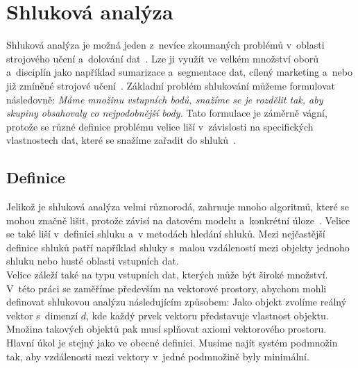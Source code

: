 \chapter{Shluková analýza} \label{sec:clusteranalysis}
Shluková analýza je možná jeden z~nevíce zkoumaných problémů v~oblasti strojového učení a~dolování dat~\cite{Aggarwal13}. Lze ji využít ve velkém množství oborů a~disciplín jako například sumarizace a~segmentace dat, cílený marketing a~nebo již zmíněné strojové učení~\cite{Jain10, Kaufman90}. Základní problém shlukování můžeme formulovat následovně: \textit{Máme množinu vstupních bodů, snažíme se je rozdělit tak, aby skupiny obsahovaly co nejpodobnější body.} Tato formulace je záměrně vágní, protože se různé definice problému velice liší v~závislosti na specifických vlastnostech dat, které se snažíme zařadit do shluků~\cite{Aggarwal13}. 

\section{Definice}
Jelikož je shluková analýza velmi různorodá, zahrnuje mnoho algoritmů, které se mohou značně lišit, protože závisí na datovém modelu a~konkrétní úloze~\cite{Aggarwal13}. Velice se také liší v~definici shluku a~v metodách hledání shluků. Mezi nejčastější definice shluků patří například shluky s~malou vzdá\-le\-nos\-tí mezi objekty jednoho shluku nebo husté oblasti vstupních dat.\\

Velice záleží také na typu vstupních dat, kterých může být široké množství. V~této práci se zaměříme především na vektorové prostory, abychom mohli definovat shlukovou analýzu následujícím způsobem: Jako objekt zvolíme reálný vektor s~dimenzí $d$, kde každý prvek vektoru představuje vlastnost objektu. Množina takových objektů pak musí splňovat axiomi vektorového prostoru. Hlavní úkol je stejný jako ve obecné definici. Musíme najít systém podmnožin tak, aby vzdálenosti mezi vektory v~jedné podmnožině byly minimální.

